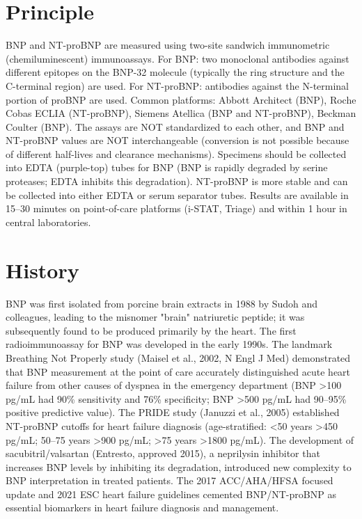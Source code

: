 \section*{Principle}
BNP and NT-proBNP are measured using two-site sandwich immunometric (chemiluminescent) immunoassays. For BNP: two monoclonal antibodies against different epitopes on the BNP-32 molecule (typically the ring structure and the C-terminal region) are used. For NT-proBNP: antibodies against the N-terminal portion of proBNP are used. Common platforms: Abbott Architect (BNP), Roche Cobas ECLIA (NT-proBNP), Siemens Atellica (BNP and NT-proBNP), Beckman Coulter (BNP). The assays are NOT standardized to each other, and BNP and NT-proBNP values are NOT interchangeable (conversion is not possible because of different half-lives and clearance mechanisms). Specimens should be collected into EDTA (purple-top) tubes for BNP (BNP is rapidly degraded by serine proteases; EDTA inhibits this degradation). NT-proBNP is more stable and can be collected into either EDTA or serum separator tubes. Results are available in 15--30 minutes on point-of-care platforms (i-STAT, Triage) and within 1 hour in central laboratories.

\section*{History}
BNP was first isolated from porcine brain extracts in 1988 by Sudoh and colleagues, leading to the misnomer "brain" natriuretic peptide; it was subsequently found to be produced primarily by the heart. The first radioimmunoassay for BNP was developed in the early 1990s. The landmark Breathing Not Properly study (Maisel et al., 2002, N Engl J Med) demonstrated that BNP measurement at the point of care accurately distinguished acute heart failure from other causes of dyspnea in the emergency department (BNP >100 pg/mL had 90\% sensitivity and 76\% specificity; BNP >500 pg/mL had 90--95\% positive predictive value). The PRIDE study (Januzzi et al., 2005) established NT-proBNP cutoffs for heart failure diagnosis (age-stratified: <50 years >450 pg/mL; 50--75 years >900 pg/mL; >75 years >1800 pg/mL). The development of sacubitril/valsartan (Entresto, approved 2015), a neprilysin inhibitor that increases BNP levels by inhibiting its degradation, introduced new complexity to BNP interpretation in treated patients. The 2017 ACC/AHA/HFSA focused update and 2021 ESC heart failure guidelines cemented BNP/NT-proBNP as essential biomarkers in heart failure diagnosis and management.

